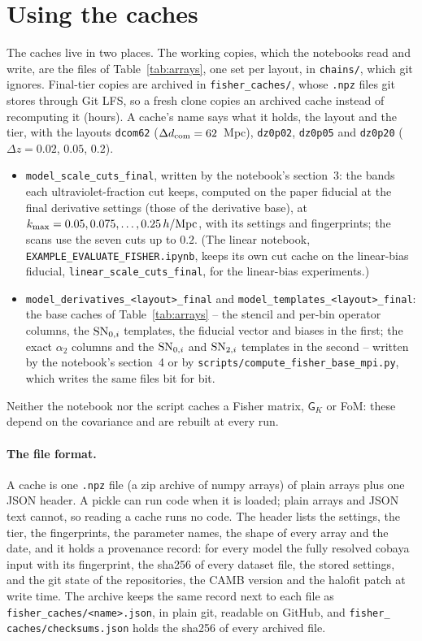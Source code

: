 \documentclass[11pt]{article}
\newcommand{\kmax}{k_{\rm max}}
\newcommand{\hMpc}{\,h/{\rm Mpc}}
\newcommand{\SNzi}{{\rm SN}_{0,i}}
\newcommand{\SNti}{{\rm SN}_{2,i}}
\newcommand{\mG}{\mathsf{G}}
\newcommand{\us}{\_\allowbreak}
\begin{document}
\section{Using the caches}
\label{sec:usage}

The caches live in two places.  The working copies, which the
notebooks read and write, are the files of Table~\ref{tab:arrays}, one
set per layout, in \texttt{chains/}, which git ignores.  Final-tier
copies are archived in \texttt{fisher\us caches/}, whose \texttt{.npz}
files git stores through Git LFS, so a fresh clone copies an archived
cache instead of recomputing it (hours).  A cache's name says what it
holds, the layout and the tier, with the layouts \texttt{dcom62}
($\Delta d_{\rm com} = 62$~Mpc), \texttt{dz0p02}, \texttt{dz0p05} and
\texttt{dz0p20} ($\Delta z = 0.02$, $0.05$, $0.2$).
\begin{itemize}
  \item \texttt{model\us scale\us cuts\us final}, written by the
    notebook's section~3: the bands each
    ultraviolet-fraction cut keeps, computed on the paper fiducial at
    the final derivative settings (those of the derivative base), at
    $\kmax = 0.05, 0.075, \ldots, 0.25\hMpc$, with its settings and
    fingerprints; the scans use the seven
    cuts up to $0.2$.  (The linear notebook,
    \texttt{EXAMPLE\us EVALUATE\us FISHER.ipynb}, keeps its own cut
    cache on the linear-bias fiducial,
    \texttt{linear\us scale\us cuts\us final}, for the linear-bias
    experiments.)
  \item \texttt{model\us derivatives\us<layout>\us final} and
    \texttt{model\us templates\us<layout>\us final}: the base caches of
    Table~\ref{tab:arrays} -- the stencil and per-bin operator columns,
    the $\SNzi$ templates, the fiducial vector and biases in the first;
    the exact $\alpha_2$ columns and the $\SNzi$ and $\SNti$ templates
    in the second -- written by the notebook's section~4 or by
    \texttt{scripts/compute\us fisher\us base\us mpi.py}, which writes
    the same files bit for bit.
\end{itemize}
Neither the notebook nor the script caches a Fisher matrix, $\mG_K$ or
FoM: these depend on the covariance and are rebuilt at every run.

\paragraph{The file format.}
A cache is one \texttt{.npz} file (a zip archive of numpy arrays) of
plain arrays plus one JSON header.  A pickle can run code when it is
loaded; plain arrays and JSON text cannot, so reading a cache runs no
code.  The header lists the settings, the tier, the fingerprints, the
parameter names, the shape of every array and the date, and it holds a
provenance record: for every model the fully resolved cobaya input
with its fingerprint, the sha256 of every dataset file, the stored
settings, and the git state of the repositories, the CAMB version and
the halofit patch at write time.  The archive keeps the same record
next to each file as \texttt{fisher\us caches/<name>.json}, in plain
git, readable on GitHub, and \texttt{fisher\us
caches/checksums.json} holds the sha256 of every archived file.
\end{document}

